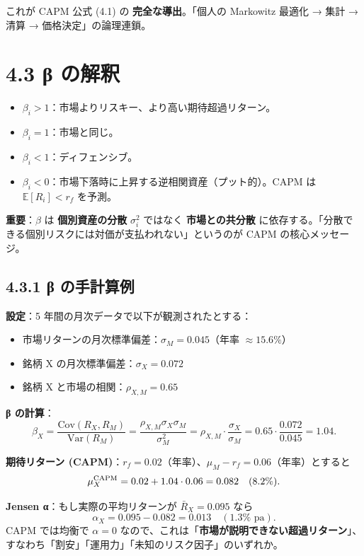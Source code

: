 \documentclass[11pt,a4paper]{report}
\begin{document}
これが CAPM 公式 (4.1) の \textbf{完全な導出}。「個人の Markowitz 最適化 → 集計 → 清算 → 価格決定」の論理連鎖。

\section{4.3 β の解釈}

\begin{itemize}
\item $\beta_i > 1$：市場よりリスキー、より高い期待超過リターン。
\item $\beta_i = 1$：市場と同じ。
\item $\beta_i < 1$：ディフェンシブ。
\item $\beta_i < 0$：市場下落時に上昇する逆相関資産（プット的）。CAPM は $\mathbb{E}[R_i] < r_f$ を予測。
\end{itemize}

\textbf{重要}：$\beta$ は \textbf{個別資産の分散} $\sigma_i^2$ ではなく \textbf{市場との共分散} に依存する。「分散できる個別リスクには対価が支払われない」というのが CAPM の核心メッセージ。

\subsection{4.3.1 β の手計算例}

\textbf{設定}：5 年間の月次データで以下が観測されたとする：
\begin{itemize}
\item 市場リターンの月次標準偏差：$\sigma_M = 0.045$（年率 $\approx 15.6\%$）
\item 銘柄 X の月次標準偏差：$\sigma_X = 0.072$
\item 銘柄 X と市場の相関：$\rho_{X,M} = 0.65$
\end{itemize}

\textbf{β の計算}： \[ \beta_X = \frac{\mathrm{Cov}(R_X, R_M)}{\mathrm{Var}(R_M)} = \frac{\rho_{X,M} \sigma_X \sigma_M}{\sigma_M^2} = \rho_{X,M} \cdot \frac{\sigma_X}{\sigma_M} = 0.65 \cdot \frac{0.072}{0.045} = 1.04. \]

\textbf{期待リターン (CAPM)}：$r_f = 0.02$（年率）、$\mu_M - r_f = 0.06$（年率）とすると \[ \mu_X^{\rm CAPM} = 0.02 + 1.04 \cdot 0.06 = 0.082\quad (8.2\%). \]

\textbf{Jensen α}：もし実際の平均リターンが $\bar R_X = 0.095$ なら \[ \alpha_X = 0.095 - 0.082 = 0.013\quad (1.3\%\text{ pa}). \] CAPM では均衡で $\alpha = 0$ なので、これは「\textbf{市場が説明できない超過リターン}」、すなわち「割安」「運用力」「未知のリスク因子」のいずれか。
\end{document}

